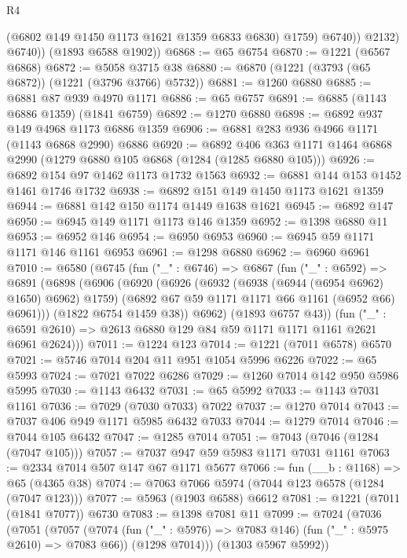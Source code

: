 \begin{lexlean}{R4}
\begin{coremodule}
                  (@6802 @149 @1450 @1173 @1621 @1359 @6833 @6830)
                  @1759)
                @6740))
            @2132)
          @6740))
      (@1893 @6588 @1902))
@6868 := @65 @6754
@6870 := @1221 (@6567 @6868)
@6872 := @5058 @3715 @38
@6880 := @6870 (@1221 (@3793 (@65 @6872)) (@1221 (@3796 @3766) @5732))
@6881 := @1260 @6880
@6885 := @6881 @87 @939 @4970 @1171
@6886 := @65 @6757
@6891 := @6885 (@1143 @6886 @1359) (@1841 @6759)
@6892 := @1270 @6880
@6898 := @6892 @937 @149 @4968 @1173 @6886 @1359
@6906 := @6881 @283 @936 @4966 @1171 (@1143 @6868 @2990) @6886
@6920 := @6892 @406 @363 @1171 @1464 @6868 @2990 (@1279 @6880 @105 @6868 (@1284 (@1285 @6880 @105)))
@6926 := @6892 @154 @97 @1462 @1173 @1732 @1563
@6932 := @6881 @144 @153 @1452 @1461 @1746 @1732
@6938 := @6892 @151 @149 @1450 @1173 @1621 @1359
@6944 := @6881 @142 @150 @1174 @1449 @1638 @1621
@6945 := @6892 @147
@6950 := @6945 @149 @1171 @1173 @146 @1359
@6952 := @1398 @6880 @11
@6953 := @6952 @146
@6954 := @6950 @6953
@6960 := @6945 @59 @1171 @1171 @146 @1161 @6953
@6961 := @1298 @6880
@6962 := @6960 @6961
@7010 := @6580
    (@6745
      (fun ("_" : @6746) =>
      @6867
        (fun ("_" : @6592) =>
        @6891
          (@6898
            (@6906
              (@6920
                (@6926
                  (@6932 (@6938 (@6944 (@6954 @6962) @1650) @6962) @1759)
                  (@6892 @67 @59 @1171 @1171 @66 @1161 (@6952 @66) @6961)))
              (@1822 @6754 @1459 @38))
            @6962)
          (@1893 @6757 @43))
        (fun ("_" : @6591 @2610) => @2613 @6880 @129 @84 @59 @1171 @1171 @1161 @2621 @6961 @2624)))
@7011 := @1224 @123
@7014 := @1221 (@7011 @6578) @6570
@7021 := @5746 @7014 @204 @11 @951 @1054 @5996 @6226
@7022 := @65 @5993
@7024 := @7021 @7022 @6286
@7029 := @1260 @7014 @142 @950 @5986 @5995
@7030 := @1143 @6432
@7031 := @65 @5992
@7033 := @1143 @7031 @1161
@7036 := @7029 (@7030 @7033) @7022
@7037 := @1270 @7014
@7043 := @7037 @406 @949 @1171 @5985 @6432 @7033
@7044 := @1279 @7014
@7046 := @7044 @105 @6432
@7047 := @1285 @7014
@7051 := @7043 (@7046 (@1284 (@7047 @105)))
@7057 := @7037 @947 @59 @5983 @1171 @7031 @1161
@7063 := @2334 @7014 @507 @147 @67 @1171 @5677
@7066 := fun (__b : @1168) => @65 (@4365 @38)
@7074 := @7063 @7066 @5974 (@7044 @123 @6578 (@1284 (@7047 @123)))
@7077 := @5963 (@1903 @6588) @6612
@7081 := @1221 (@7011 (@1841 @7077)) @6730
@7083 := @1398 @7081 @11
@7099 := @7024
    (@7036
      (@7051
        (@7057
          (@7074 (fun ("_" : @5976) => @7083 @146) (fun ("_" : @5975 @2610) => @7083 @66))
          (@1298 @7014)))
      (@1303 @5967 @5992))

\end{coremodule}
\end{lexlean}
